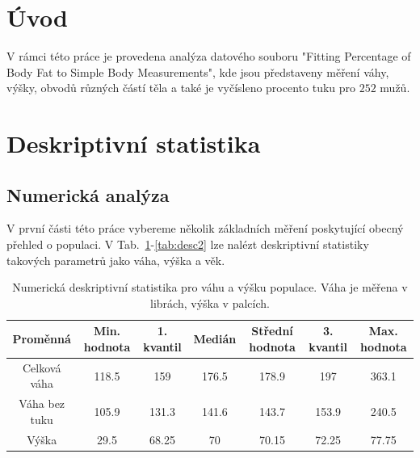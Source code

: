 \documentclass[11pt,american,czech]{article}
\begin{document}
\begin{titlepage}
	
%	
	
	\vfill %
	
\end{titlepage}


\section{Úvod}\label{sec:1}

V rámci této práce je provedena analýza datového souboru "Fitting Percentage of Body Fat to Simple Body Measurements", kde jsou představeny měření váhy, výšky, obvodů různých částí těla a také je vyčísleno procento tuku pro $252$ mužů.

\section{Deskriptivní statistika}

\subsection{Numerická analýza}

V první části této práce vybereme několik základních měření poskytující obecný přehled o populaci. V Tab.~\ref{tab:desc1}-\ref{tab:desc2} lze nalézt deskriptivní statistiky takových parametrů jako váha, výška a věk.

\medskip

\begin{table}[ht!]
	\centering
	\begin{tabular}{|c||c|c|c|c|c|c|}
		\hline 
		Proměnná &  Min. hodnota &  1. kvantil &  Medián &  Střední hodnota &  3. kvantil & Max. hodnota   \\ 
		\hline \hline 
		Celková váha & 118.5 & 159 & 176.5 & 178.9 & 197 & 363.1   \\ 
		\hline 
		Váha bez tuku & 105.9 & 131.3 & 141.6 & 143.7 & 153.9 & 240.5   \\ 
		\hline 
		Výška & 29.5 & 68.25 & 70 & 70.15 & 72.25 & 77.75   \\ 
		\hline 
	\end{tabular} 
	\caption{Numerická deskriptivní statistika pro váhu a výšku populace. Váha je měřena v librách, výška v palcích.}	
	\label{tab:desc1}
\end{table}
\end{document}
